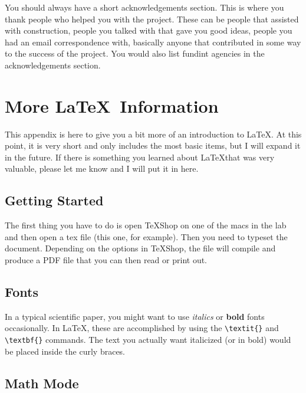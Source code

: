 \documentclass[preprint,pre,floats,aps,amsmath,amssymb]{revtex4}
\begin{document}
\begin{acknowledgments}

You should always have a short acknowledgements section. This is where you thank people who helped you with the project. These can be people that assisted with construction, people you talked with that gave you good ideas, people you had an email correspondence with, basically anyone that contributed in some way to the success of the project. You would also list fundint agencies in the acknowledgements section.

\end{acknowledgments}

\appendix*

\section{More \LaTeX\ Information}
\label{sec:latex}

This appendix is here to give you a bit more of an introduction to \LaTeX. At this point, it is very short and only includes the most basic items, but I will expand it in the future. If there is something you learned about \LaTeX that was very valuable, please let me know and I will put it in here.

\subsection{Getting Started}

The first thing you have to do is open TeXShop on one of the macs in the lab and then open a tex file (this one, for example). Then you need to typeset the document. Depending on the options in TeXShop, the file will compile and produce a PDF file that you can then read or print out.

\subsection{Fonts}

In a typical scientific paper, you might want to use \textit{italics} or \textbf{bold} fonts occasionally. In \LaTeX, these are accomplished by using the \verb!\textit{}! and \verb!\textbf{}! commands. The text you actually want italicized (or in bold) would be placed inside the curly braces.

\subsection{Math Mode}
\end{document}

